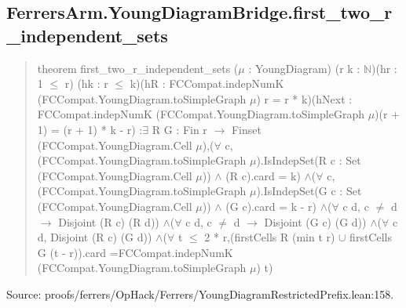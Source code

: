 \documentclass[11pt,a4paper]{article}
\begin{document}
\begin{samepage}
\subsection{FerrersArm.YoungDiagramBridge.first\_two\_r\_independent\_sets}
\begin{quote}\small\ttfamily theorem first\_two\_r\_independent\_sets (\ensuremath{\mu} : YoungDiagram) (r k : \ensuremath{\mathbb{N}})\newline     (hr : 1 \ensuremath{\leq} r) (hk : r \ensuremath{\leq} k)\newline     (hR : FCCompat.indepNumK (FCCompat.YoungDiagram.toSimpleGraph \ensuremath{\mu}) r = r * k)\newline     (hNext : FCCompat.indepNumK (FCCompat.YoungDiagram.toSimpleGraph \ensuremath{\mu})\newline       (r + 1) = (r + 1) * k - r) :\newline     \ensuremath{\exists} R G : Fin r \ensuremath{\to} Finset (FCCompat.YoungDiagram.Cell \ensuremath{\mu}),\newline       (\ensuremath{\forall} c, (FCCompat.YoungDiagram.toSimpleGraph \ensuremath{\mu}).IsIndepSet\newline         (R c : Set (FCCompat.YoungDiagram.Cell \ensuremath{\mu})) \ensuremath{\wedge} (R c).card = k) \ensuremath{\wedge}\newline       (\ensuremath{\forall} c, (FCCompat.YoungDiagram.toSimpleGraph \ensuremath{\mu}).IsIndepSet\newline         (G c : Set (FCCompat.YoungDiagram.Cell \ensuremath{\mu})) \ensuremath{\wedge} (G c).card = k - r) \ensuremath{\wedge}\newline       (\ensuremath{\forall} c d, c \ensuremath{\neq} d \ensuremath{\to} Disjoint (R c) (R d)) \ensuremath{\wedge}\newline       (\ensuremath{\forall} c d, c \ensuremath{\neq} d \ensuremath{\to} Disjoint (G c) (G d)) \ensuremath{\wedge}\newline       (\ensuremath{\forall} c d, Disjoint (R c) (G d)) \ensuremath{\wedge}\newline       (\ensuremath{\forall} t \ensuremath{\leq} 2 * r,\newline         (firstCells R (min t r) \ensuremath{\cup} firstCells G (t - r)).card =\newline           FCCompat.indepNumK (FCCompat.YoungDiagram.toSimpleGraph \ensuremath{\mu}) t)\end{quote}
{\small Source: proofs/ferrers/OpHack/Ferrers/YoungDiagramRestrictedPrefix.lean:158.\par}


\end{samepage}
\end{document}
